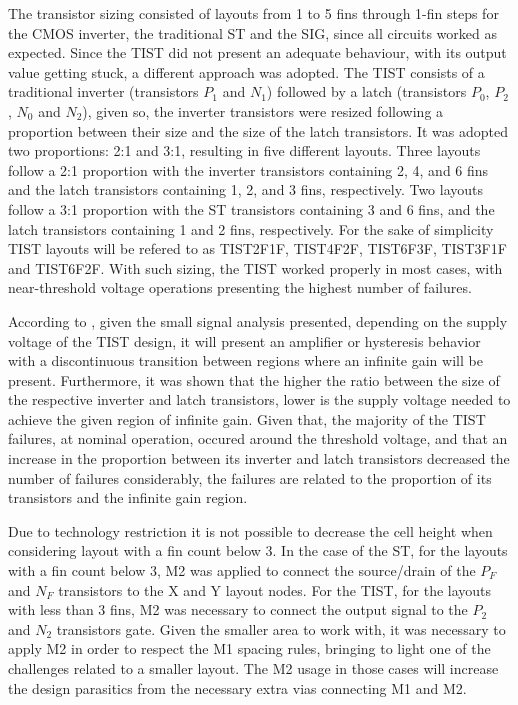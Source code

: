 \documentclass[pgmicro,mestrado,english]{iiufrgs}
\begin{document}
The transistor sizing consisted of layouts from 1 to 5 fins through 1-fin steps for the CMOS inverter, the traditional ST and the SIG, since all circuits worked as expected. Since the TIST did not present an adequate behaviour, with its output value getting stuck, a different approach was adopted. The TIST consists of a traditional inverter (transistors $P_1$ and $N_1$) followed by a latch (transistors $P_0$, $P_2$, $N_0$ and $N_2$), given so, the inverter transistors were resized following a proportion between their size and the size of the latch transistors. It was adopted two proportions: 2:1 and 3:1, resulting in five different layouts. Three layouts follow a 2:1 proportion with the inverter transistors containing 2, 4, and 6 fins and the latch transistors containing 1, 2, and 3 fins, respectively. Two layouts follow a 3:1 proportion with the ST transistors containing 3 and 6 fins, and the latch transistors containing 1 and 2 fins, respectively. For the sake of simplicity TIST layouts will be refered to as TIST2F1F, TIST4F2F, TIST6F3F, TIST3F1F and TIST6F2F. With such sizing, the TIST worked properly in most cases, with near-threshold voltage operations presenting the highest number of failures.

According to \cite{thiagoTIST}, given the small signal analysis presented, depending on the supply voltage of the TIST design, it will present an amplifier or hysteresis behavior with a discontinuous transition between regions where an infinite gain will be present. Furthermore, it was shown that the higher the ratio between the size of the respective inverter and latch transistors, lower is the supply voltage needed to achieve the given region of infinite gain. Given that, the majority of the TIST failures, at nominal operation, occured around the threshold voltage, and that an increase in the proportion between its inverter and latch transistors decreased the number of failures considerably, the failures are related to the proportion of its transistors and the infinite gain region.

Due to technology restriction it is not possible to decrease the cell height when considering layout with a fin count below 3. In the case of the ST, for the layouts with a fin count below 3, M2 was applied to connect the source/drain of the ${P_F}$ and ${N_F}$ transistors to the X and Y layout nodes. For the TIST, for the layouts with less than 3 fins, M2 was necessary to connect the output signal to the $P_2$ and $N_2$ transistors gate. Given the smaller area to work with, it was necessary to apply M2 in order to respect the M1 spacing rules, bringing to light one of the challenges related to a smaller layout. The M2 usage in those cases will increase the design parasitics from the necessary extra vias connecting M1 and M2. 
\end{document}
